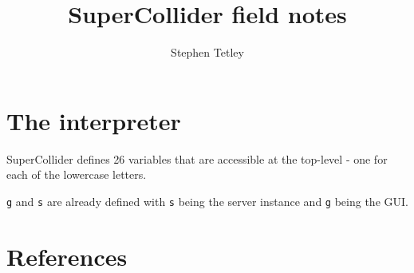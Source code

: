 \documentclass{article}
\begin{document}
\author{Stephen Tetley}
\title{SuperCollider field notes}
\maketitle




\section{The interpreter}


SuperCollider defines 26 variables that are accessible at the 
top-level - one for each of the lowercase letters. 

\texttt{g} and \texttt{s} are already defined with \texttt{s} 
being the server instance and \texttt{g} being the GUI.


\section{References}
\end{document}
